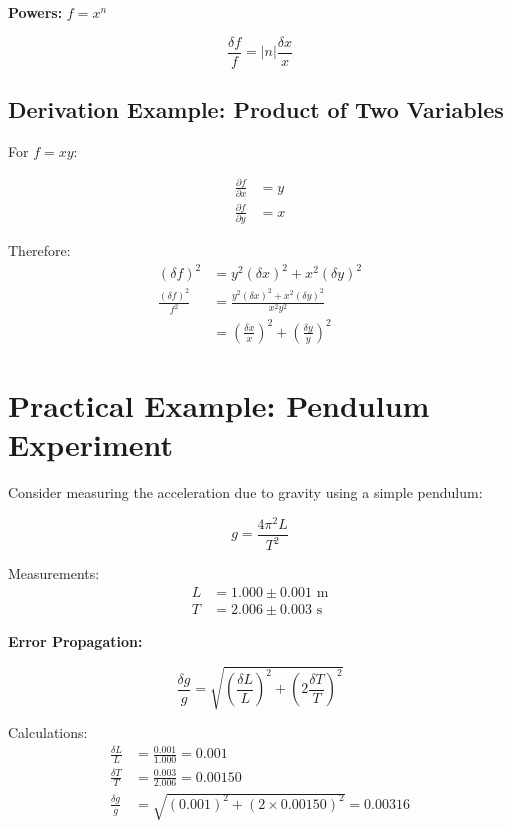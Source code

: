 \documentclass[twoside]{book}
\begin{document}
\textbf{Powers:} $f = x^n$

\begin{equation}
\frac{\delta f}{f} = |n|\frac{\delta x}{x}
\end{equation}

\subsection{Derivation Example: Product of Two Variables}

For $f = xy$:

\begin{align}
\frac{\partial f}{\partial x} &= y \\
\frac{\partial f}{\partial y} &= x
\end{align}

Therefore:
\begin{align}
(\delta f)^2 &= y^2(\delta x)^2 + x^2(\delta y)^2 \\
\frac{(\delta f)^2}{f^2} &= \frac{y^2(\delta x)^2 + x^2(\delta y)^2}{x^2y^2} \\
&= \left(\frac{\delta x}{x}\right)^2 + \left(\frac{\delta y}{y}\right)^2
\end{align}

\section{Practical Example: Pendulum Experiment}

Consider measuring the acceleration due to gravity using a simple pendulum:

\begin{equation}
g = \frac{4\pi^2 L}{T^2}
\end{equation}

Measurements:
\begin{align}
L &= 1.000 \pm 0.001 \text{ m} \\
T &= 2.006 \pm 0.003 \text{ s}
\end{align}

\textbf{Error Propagation:}

\begin{equation}
\frac{\delta g}{g} = \sqrt{\left(\frac{\delta L}{L}\right)^2 + \left(2\frac{\delta T}{T}\right)^2}
\end{equation}

Calculations:
\begin{align}
\frac{\delta L}{L} &= \frac{0.001}{1.000} = 0.001 \\
\frac{\delta T}{T} &= \frac{0.003}{2.006} = 0.00150 \\
\frac{\delta g}{g} &= \sqrt{(0.001)^2 + (2 \times 0.00150)^2} = 0.00316
\end{align}
\end{document}

